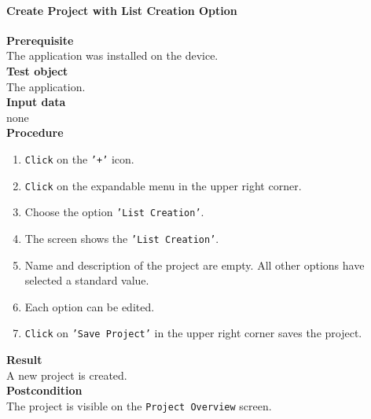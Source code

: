 \paragraph*{\textbf{Create Project with List Creation Option}}
\textbf{Prerequisite}\\
The application was installed on the device.\\
\textbf{Test object}\\
The application.\\
\textbf{Input data}\\
none\\
\textbf{Procedure}
\begin{enumerate}
	\item \texttt{Click} on the \texttt{'+'} icon.
	\item \texttt{Click} on the expandable menu in the upper right corner.
	\item Choose the option \texttt{'List Creation'}.
	\item The screen shows the \texttt{'List Creation'}.
	\item Name and description of the project are empty. All other options have selected a standard value.
	\item Each option can be edited.
	\item \texttt{Click} on \texttt{'Save Project'} in the upper right corner saves the project.
\end{enumerate}
\textbf{Result}\\
A new project is created.\\
\textbf{Postcondition}\\
The project is visible on the \texttt{Project Overview} screen.
